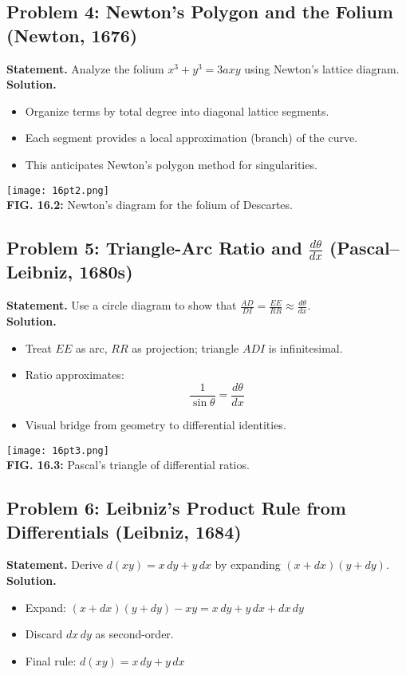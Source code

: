 \documentclass[9pt]{article}
\begin{document}
\newpage

\subsection*{Problem 4: Newton’s Polygon and the Folium (Newton, 1676)}
\textbf{Statement.} Analyze the folium \( x^3 + y^3 = 3axy \) using Newton’s lattice diagram. \\
\textbf{Solution.}
\begin{itemize}
  \item Organize terms by total degree into diagonal lattice segments.
  \item Each segment provides a local approximation (branch) of the curve.
  \item This anticipates Newton’s polygon method for singularities.
\end{itemize}
\begin{center}
\texttt{[image: 16pt2.png]} \\
\textbf{FIG. 16.2:} Newton’s diagram for the folium of Descartes.
\end{center}

\newpage

\subsection*{Problem 5: Triangle-Arc Ratio and \( \frac{d\theta}{dx} \) (Pascal–Leibniz, 1680s)}
\textbf{Statement.} Use a circle diagram to show that \( \frac{AD}{DI} = \frac{EE}{RR} \approx \frac{d\theta}{dx} \). \\
\textbf{Solution.}
\begin{itemize}
  \item Treat \( EE \) as arc, \( RR \) as projection; triangle \( ADI \) is infinitesimal.
  \item Ratio approximates:
  \[
  \frac{1}{\sin \theta} = \frac{d\theta}{dx}
  \]
  \item Visual bridge from geometry to differential identities.
\end{itemize}
\begin{center}
\texttt{[image: 16pt3.png]} \\
\textbf{FIG. 16.3:} Pascal’s triangle of differential ratios.
\end{center}

\newpage

\subsection*{Problem 6: Leibniz’s Product Rule from Differentials (Leibniz, 1684)}
\textbf{Statement.} Derive \( d(xy) = x \, dy + y \, dx \) by expanding \( (x + dx)(y + dy) \). \\
\textbf{Solution.}
\begin{itemize}
  \item Expand: \( (x + dx)(y + dy) - xy = x\,dy + y\,dx + dx\,dy \)
  \item Discard \( dx\,dy \) as second-order.
  \item Final rule: \( d(xy) = x\,dy + y\,dx \)
\end{itemize}
\end{document}
